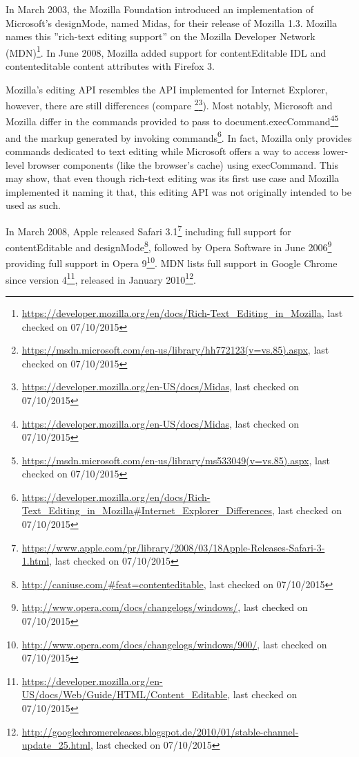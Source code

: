 In March 2003, the Mozilla Foundation introduced an implementation of Microsoft's designMode, named Midas, for their release of Mozilla 1.3. Mozilla names this ''rich-text editing support'' on the Mozilla Developer Network (MDN)\footnote{\url{https://developer.mozilla.org/en/docs/Rich-Text\_Editing\_in\_Mozilla}, last checked on 07/10/2015}. In June 2008, Mozilla added support for contentEditable IDL and contenteditable content attributes with Firefox 3. 

Mozilla's editing API resembles the API implemented for Internet Explorer, however, there are still differences (compare \footnote{\url{https://msdn.microsoft.com/en-us/library/hh772123(v=vs.85).aspx}, last checked on 07/10/2015}\footnote{\url{https://developer.mozilla.org/en-US/docs/Midas}, last checked on 07/10/2015}). Most notably, Microsoft and Mozilla differ in the commands provided to pass to document.execCommand\footnote{\url{https://developer.mozilla.org/en-US/docs/Midas}, last checked on 07/10/2015}\footnote{\url{https://msdn.microsoft.com/en-us/library/ms533049(v=vs.85).aspx}, last checked on 07/10/2015} and the markup generated by invoking commands\footnote{\url{https://developer.mozilla.org/en/docs/Rich-Text\_Editing\_in\_Mozilla#Internet\_Explorer\_Differences}, last checked on 07/10/2015}. In fact, Mozilla only provides commands dedicated to text editing while Microsoft offers a way to access lower-level browser components (like the browser's cache) using execCommand. This may show, that even though rich-text editing was its first use case and Mozilla implemented it naming it that, this editing API was not originally intended to be used as such.

In March 2008, Apple released Safari 3.1\footnote{\url{https://www.apple.com/pr/library/2008/03/18Apple-Releases-Safari-3-1.html}, last checked on 07/10/2015} including full support for contentEditable and designMode\footnote{\url{http://caniuse.com/#feat=contenteditable}, last checked on 07/10/2015}, followed by Opera Software in June 2006\footnote{\url{http://www.opera.com/docs/changelogs/windows/}, last checked on 07/10/2015} providing full support in Opera 9\footnote{\url{http://www.opera.com/docs/changelogs/windows/900/}, last checked on 07/10/2015}. MDN lists full support in Google Chrome since version 4\footnote{\url{https://developer.mozilla.org/en-US/docs/Web/Guide/HTML/Content\_Editable}, last checked on 07/10/2015}, released in January 2010\footnote{\url{http://googlechromereleases.blogspot.de/2010/01/stable-channel-update\_25.html}, last checked on 07/10/2015}.

